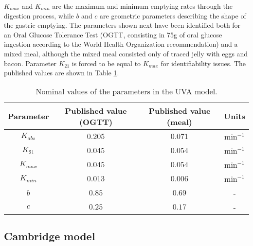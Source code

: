 $K_{max}$ and $K_{min}$ are the maximum and minimum emptying rates through the digestion process, while $b$ and $c$ are geometric parameters describing the shape of the gastric emptying. The parameters shown next have been identified both for an Oral Glucose Tolerance Test (OGTT, consisting in 75g of oral glucose ingestion according to the World Health Organization recommendation) and a mixed meal, although the mixed meal consisted only of traced jelly with eggs and bacon. Parameter $K_{21}$ is forced to be equal to $K_{max}$ for identifiability issues. The published values are shown in Table \ref{tab:dallaman}.

\begin{table}[hbtp]
	\centering
		\begin{tabular}{|c c c c|}
		\hline 
		Parameter & Published value (OGTT) & Published value (meal) & Units \\
		\hline 
		$K_{abs}$ & $0.205$ & $0.071$ & min$^{-1}$ \\
		$K_{21}$ & $0.045$ & $0.054$ & min$^{-1}$ \\
		$K_{max}$ & $0.045$ & $0.054$ & min$^{-1}$ \\
		$K_{min}$ & $0.013$ & $0.006$ & min$^{-1}$ \\
		$b$ & $0.85$ & $0.69$ & - \\
		$c$ & $0.25$ & $0.17$ & - \\
		\hline
		\end{tabular}
	\caption{Nominal values of the parameters in the UVA model.}
	\label{tab:dallaman}
\end{table}


\subsection{Cambridge model}
\label{sec:ModelBasedOnHovorkaEtAl}

